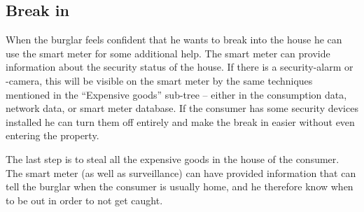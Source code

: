 \subsection{Break in}
When the burglar feels confident that he wants to break into the house he can use the smart meter for some additional help.
The smart meter can provide information about the security status of the house.
If there is a security-alarm or -camera, this will be visible on the smart meter by the same techniques mentioned in the ``Expensive goods'' sub-tree -- either in the consumption data, network data, or smart meter database.
If the consumer has some security devices installed he can turn them off entirely and make the break in easier without even entering the property.

The last step is to steal all the expensive goods in the house of the consumer.
The smart meter (as well as surveillance) can have provided information that can tell the burglar when the consumer is usually home, and he therefore know when to be out in order to not get caught.

